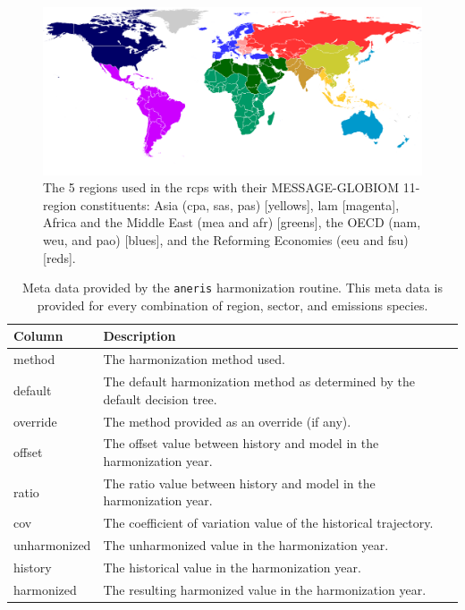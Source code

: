 \documentclass[review]{elsarticle}
\newcommand{\code}[1]{\lstinline[basicstyle=\ttfamily\color{black}]|#1|}
\begin{document}
\begin{figure}
  \begin{center}
    \includegraphics[width=\textwidth]{MESSAGE_11-5regions_map.pdf}
    \caption[]{
      \label{fig:regions}
      The 5 regions used in the \glspl{rcp} with their MESSAGE-GLOBIOM 11-region
      constituents: Asia (\gls{cpa}, \gls{sas}, \gls{pas}) [yellows], \gls{lam}
      [magenta], Africa and the Middle East (\gls{mea} and \gls{afr}) [greens],
      the OECD (\gls{nam}, \gls{weu}, and \gls{pao}) [blues], and the Reforming
      Economies (\gls{eeu} and \gls{fsu}) [reds].  }
  \end{center}
\end{figure}

\begin{table}[]
\centering
\caption{Meta data provided by the \code{aneris} harmonization routine. This meta data is provided for every combination of region, sector, and emissions species.}
\label{tab:metadata}
\begin{tabular}{|p{2cm}|p{8cm}|}
\hline
\textbf{Column}       & \textbf{Description}                                      \\
\hline
\hline
method       & The harmonization method used.                                               \\
\hline
default      & The default harmonization method as determined by the default decision tree. \\
\hline
override     & The method provided as an override (if any).                                 \\
\hline
offset       & The offset value between history and model in the harmonization year.        \\
\hline
ratio        & The ratio value between history and model in the harmonization year.         \\
\hline
cov          & The coefficient of variation value of the historical trajectory.                           \\
\hline
unharmonized & The unharmonized value in the harmonization year.                            \\
\hline
history      & The historical value in the harmonization year.                             \\
\hline
harmonized   & The resulting harmonized value in the harmonization year.\\
\hline
\end{tabular}
\end{table}
\end{document}
